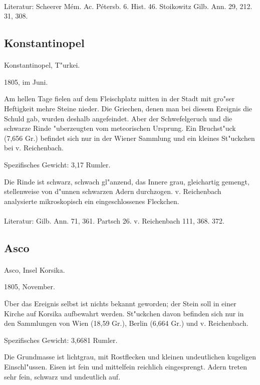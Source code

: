 \documentclass[a4paper, 11pt, oneside]{article}
\begin{document}
\paragraph{}
Literatur: Scheerer Mém. Ac. Pétersb. 6. Hist. 46. Stoikowitz Gilb. Ann. 29, 212. 31, 308.
\subsection{Konstantinopel}
\normalsize
\paragraph{}
Konstantinopel, T"urkei.

1805, im Juni.

Am hellen Tage fielen auf dem Fleischplatz mitten in der Stadt mit gro"ser Heftigkeit mehre Steine nieder. Die Griechen, denen man bei diesem Ereignis die Schuld gab, wurden deshalb angefeindet. Aber der Schwefelgeruch und die schwarze Rinde "uberzeugten vom meteorischen Ursprung. Ein Bruchst"uck (7,656 Gr.) befindet sich nur in der Wiener Sammlung und ein kleines St"uckchen bei v. Reichenbach.

Spezifisches Gewicht: 3,17 Rumler.

Die Rinde ist schwarz, schwach gl"anzend, das Innere grau, gleichartig gemengt, stellenweise von d"unnen schwarzen Adern durchzogen. v. Reichenbach analysierte mikroskopisch ein eingeschlossenes Fleckchen.
\footnotesize
\paragraph{}
Literatur: Gilb. Ann. 71, 361. Partsch 26. v. Reichenbach 111, 368. 372.
\subsection{Asco}
\normalsize
\paragraph{}
Asco, Insel Korsika.

1805, November.

Über das Ereignis selbst ist nichts bekannt geworden; der Stein soll in einer Kirche auf Korsika aufbewahrt werden. St"uckchen davon befinden sich nur in den Sammlungen von Wien (18,59 Gr.), Berlin (6,664 Gr.) und v. Reichenbach.

Spezifisches Gewicht: 3,6681 Rumler.

Die Grundmasse ist lichtgrau, mit Rostflecken und kleinen undeutlichen kugeligen Einschl"ussen. Eisen ist fein und mittelfein reichlich eingesprengt. Adern treten sehr fein, schwarz und undeutlich auf.
\footnotesize
\end{document}

